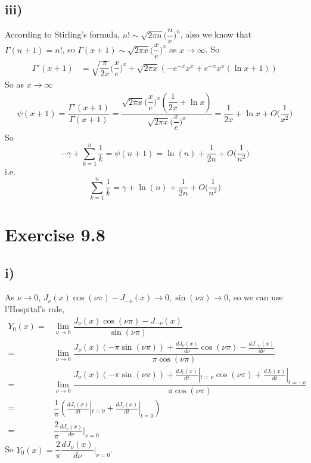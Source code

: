 \documentclass[a4paper,12pt,titlepage]{article}
\begin{document}
\subsection*{iii)}
According to Stirling's formula, $n!\sim \sqrt{2\pi n}\Big(\dfrac{n}{e}\Big)^n$, also we know that $\Gamma(n+1)=n!$, so
$\Gamma(x+1)\sim \sqrt{2\pi x}\Big(\dfrac{x}{e}\Big)^x$ as $x\rightarrow \infty$. So
\begin{align*}
\Gamma'(x+1)&=\sqrt{\dfrac{\pi}{2x}}\Big(\dfrac{x}{e}\Big)^x+\sqrt{2\pi x}(-e^{-x}x^x+e^{-x}x^x(\ln x+1))
\end{align*}
So as $x\rightarrow\infty$
\begin{align*}
\psi(x+1)=\dfrac{\Gamma'(x+1)}{\Gamma(x+1)}=\dfrac{\sqrt{2\pi x}\Big(\dfrac{x}{e}\Big)^x(\dfrac{1}{2x}+\ln x)}{\sqrt{2\pi x}\Big(\dfrac{x}{e}\Big)^x}=\dfrac{1}{2x}+\ln x+O\Big(\dfrac{1}{x^2}\Big)
\end{align*}
So
$$-\gamma+\sum\limits_{k=1}^n\dfrac{1}{k}=\psi(n+1)=\ln(n)+\dfrac{1}{2n}+O\Big(\dfrac{1}{n^2}\Big)$$
i.e.
$$\sum\limits_{k=1}^n\dfrac{1}{k}=\gamma+\ln(n)+\dfrac{1}{2n}+O\Big(\dfrac{1}{n^2}\Big)$$
\section*{Exercise 9.8}
\subsection*{i)}

As $\nu\rightarrow0$, $J_{\nu}(x)\cos(\nu \pi)-J_{-\nu}(x)\rightarrow0,\sin(\nu \pi)\rightarrow0$, so we can use l'Hospital's rule,
\begin{align*}
Y_0(x)=&\underset{\nu\rightarrow0}{\lim}\dfrac{J_{\nu}(x)\cos(\nu \pi)-J_{-\nu}(x)}{\sin(\nu \pi)}\\
=&\underset{\nu\rightarrow0}{\lim}\dfrac{J_{\nu}(x)(-\pi\sin(\nu \pi))+\frac{dJ_{\nu}(x)}{d\nu}\cos(\nu\pi)-\frac{dJ_{-\nu}(x)}{d\nu}}{\pi\cos(\nu \pi)}\\
=&\underset{\nu\rightarrow0}{\lim}\dfrac{J_{\nu}(x)(-\pi\sin(\nu \pi))+\frac{dJ_{t}(x)}{dt}|_{t=\nu}\cos(\nu\pi)+\frac{dJ_{t}(x)}{dt}|_{t=-\nu}}{\pi\cos(\nu \pi)}\\
=&\dfrac{1}{\pi}(\frac{dJ_{t}(x)}{dt}|_{t=0}+\frac{dJ_{t}(x)}{dt}|_{t=0})\\
=&\dfrac{2}{\pi}\frac{dJ_{\nu}(x)}{d\nu}|_{\nu=0}
\end{align*}
So $Y_0(x)=\dfrac{2}{\pi}\dfrac{dJ_{\nu}(x)}{d\nu}|_{\nu=0}$.
\end{document}
